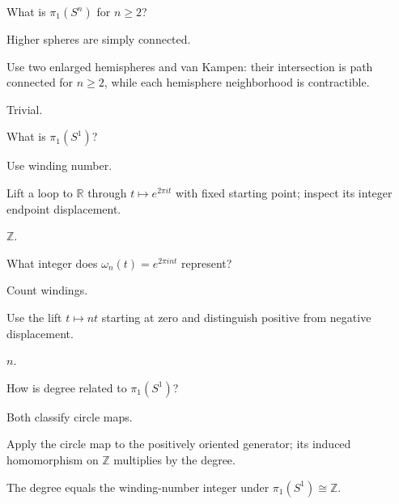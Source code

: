 \begin{exercise}\label{exr:viii09-13}
What is \(\pi_1(S^n)\) for \(n\ge2\)?
\end{exercise}
\begin{hint}
Higher spheres are simply connected.

Use two enlarged hemispheres and van Kampen: their intersection is path connected for \(n\ge2\), while each hemisphere neighborhood is contractible.
\end{hint}
\begin{solution}
Trivial.
\end{solution}

\begin{exercise}\label{exr:viii09-14}
What is \(\pi_1(S^1)\)?
\end{exercise}
\begin{hint}
Use winding number.

Lift a loop to \(\mathbb R\) through \(t\mapsto e^{2\pi it}\) with fixed starting point; inspect its integer endpoint displacement.
\end{hint}
\begin{solution}
\(\mathbb Z\).
\end{solution}

\begin{exercise}\label{exr:viii09-15}
What integer does \(\omega_n(t)=e^{2\pi int}\) represent?
\end{exercise}
\begin{hint}
Count windings.

Use the lift \(t\mapsto nt\) starting at zero and distinguish positive from negative displacement.
\end{hint}
\begin{solution}
\(n\).
\end{solution}

\begin{exercise}\label{exr:viii09-16}
How is degree related to \(\pi_1(S^1)\)?
\end{exercise}
\begin{hint}
Both classify circle maps.

Apply the circle map to the positively oriented generator; its induced homomorphism on \(\mathbb Z\) multiplies by the degree.
\end{hint}
\begin{solution}
The degree equals the winding-number integer under \(\pi_1(S^1)\cong\mathbb Z\).
\end{solution}

